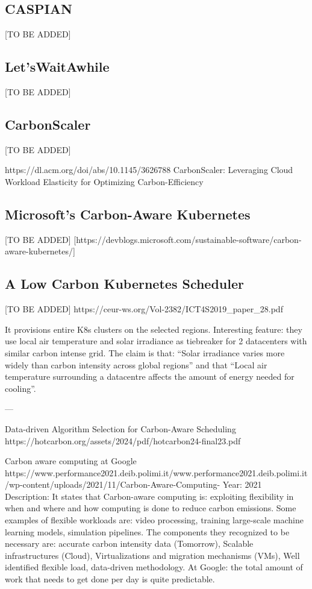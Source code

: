 \subsection{CASPIAN}

[TO BE ADDED]

\subsection{Let'sWaitAwhile}

[TO BE ADDED]

\subsection{CarbonScaler}

[TO BE ADDED]

https://dl.acm.org/doi/abs/10.1145/3626788
CarbonScaler: Leveraging Cloud Workload Elasticity for Optimizing Carbon-Efficiency

\subsection{Microsoft's Carbon-Aware Kubernetes}

[TO BE ADDED]
[https://devblogs.microsoft.com/sustainable-software/carbon-aware-kubernetes/]


\subsection{A Low Carbon Kubernetes Scheduler}
[TO BE ADDED]
https://ceur-ws.org/Vol-2382/ICT4S2019_paper_28.pdf

It provisions entire K8s clusters on the selected regions.
Interesting feature: they use local air temperature and solar irradiance as tiebreaker for 2 datacenters with similar carbon intense grid. The claim is that: “Solar irradiance varies more widely than carbon intensity across global regions” and that “Local air temperature surrounding a datacentre affects the amount of energy needed for cooling”. 


---

Data-driven Algorithm Selection for Carbon-Aware Scheduling
https://hotcarbon.org/assets/2024/pdf/hotcarbon24-final23.pdf


Carbon aware computing at Google
https://www.performance2021.deib.polimi.it/www.performance2021.deib.polimi.it/wp-content/uploads/2021/11/Carbon-Aware-Computing-%
Year: 2021
Description: 
It states that Carbon-aware computing is: exploiting flexibility in when and where and how computing is done to reduce carbon emissions.
Some examples of flexible workloads are: video processing, training large-scale machine learning models, simulation pipelines.
The components they recognized to be necessary are: accurate carbon intensity data (Tomorrow), Scalable infrastructures (Cloud), Virtualizations and migration mechanisms (VMs), Well identified flexible load, data-driven methodology.
At Google: the total amount of work that needs to get done per day is quite predictable.



